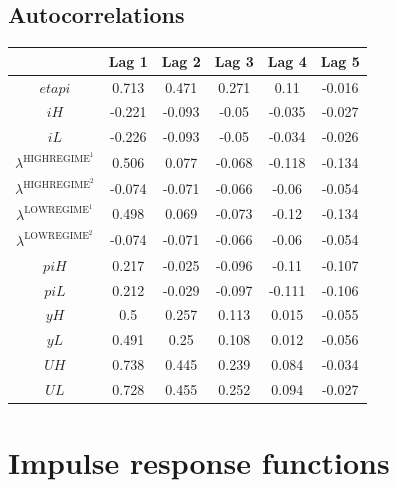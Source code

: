 \subsection{Autocorrelations}

\begin{tabular}{c|ccccc|}
  & Lag 1 & Lag 2 & Lag 3 & Lag 4 & Lag 5\\
\hline
${e\!t\!a\!p\!i}$ & 0.713 & 0.471 & 0.271 & 0.11 & -0.016 \\
${i\!H}$ & -0.221 & -0.093 & -0.05 & -0.035 & -0.027 \\
${i\!L}$ & -0.226 & -0.093 & -0.05 & -0.034 & -0.026 \\
$\lambda^{\mathrm{HIGHREGIME}^{\mathrm{1}}}$ & 0.506 & 0.077 & -0.068 & -0.118 & -0.134 \\
$\lambda^{\mathrm{HIGHREGIME}^{\mathrm{2}}}$ & -0.074 & -0.071 & -0.066 & -0.06 & -0.054 \\
$\lambda^{\mathrm{LOWREGIME}^{\mathrm{1}}}$ & 0.498 & 0.069 & -0.073 & -0.12 & -0.134 \\
$\lambda^{\mathrm{LOWREGIME}^{\mathrm{2}}}$ & -0.074 & -0.071 & -0.066 & -0.06 & -0.054 \\
${p\!i\!H}$ & 0.217 & -0.025 & -0.096 & -0.11 & -0.107 \\
${p\!i\!L}$ & 0.212 & -0.029 & -0.097 & -0.111 & -0.106 \\
${y\!H}$ & 0.5 & 0.257 & 0.113 & 0.015 & -0.055 \\
${y\!L}$ & 0.491 & 0.25 & 0.108 & 0.012 & -0.056 \\
${U\!H}$ & 0.738 & 0.445 & 0.239 & 0.084 & -0.034 \\
${U\!L}$ & 0.728 & 0.455 & 0.252 & 0.094 & -0.027 \\
\hline
\end{tabular}



\pagebreak

\section{Impulse response functions}

